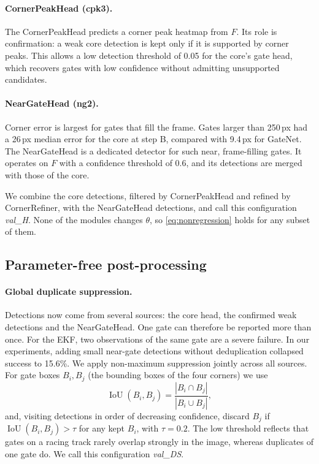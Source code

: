 \documentclass[10pt,twocolumn,letterpaper]{article}
\begin{document}
\paragraph{CornerPeakHead (cpk3).}
The CornerPeakHead predicts a corner peak heatmap from $F$. Its role is confirmation: a weak core detection is kept only if it is supported by corner peaks. This allows a low detection threshold of 0.05 for the core's gate head, which recovers gates with low confidence without admitting unsupported candidates.

\paragraph{NearGateHead (ng2).}
Corner error is largest for gates that fill the frame. Gates larger than 250\,px had a 26\,px median error for the core at step B, compared with 9.4\,px for GateNet. The NearGateHead is a dedicated detector for such near, frame-filling gates. It operates on $F$ with a confidence threshold of 0.6, and its detections are merged with those of the core.

We combine the core detections, filtered by CornerPeakHead and refined by CornerRefiner, with the NearGateHead detections, and call this configuration \emph{val\_H}. None of the modules changes $\theta$, so \cref{eq:nonregression} holds for any subset of them.

\subsection{Parameter-free post-processing}
\label{sec:postproc}
\paragraph{Global duplicate suppression.}
Detections now come from several sources: the core head, the confirmed weak detections and the NearGateHead. One gate can therefore be reported more than once. For the EKF, two observations of the same gate are a severe failure. In our experiments, adding small near-gate detections without deduplication collapsed success to 15.6\%. We apply non-maximum suppression jointly across all sources. For gate boxes $B_i, B_j$ (the bounding boxes of the four corners) we use
\begin{equation}
  \operatorname{IoU}(B_i, B_j) = \frac{|B_i \cap B_j|}{|B_i \cup B_j|},
  \label{eq:iou}
\end{equation}
and, visiting detections in order of decreasing confidence, discard $B_j$ if $\operatorname{IoU}(B_i, B_j) > \tau$ for any kept $B_i$, with $\tau = 0.2$. The low threshold reflects that gates on a racing track rarely overlap strongly in the image, whereas duplicates of one gate do. We call this configuration \emph{val\_DS}.
\end{document}
